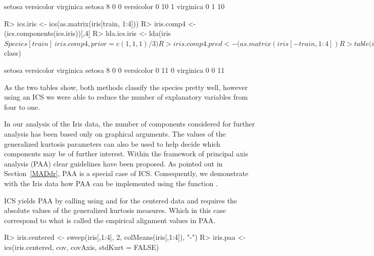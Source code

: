 \documentclass[article,nojss]{jss}
\begin{document}
\begin{Schunk}
\begin{Soutput}
             setosa versicolor virginica
  setosa          8          0         0
  versicolor      0         10         1
  virginica       0          1        10
\end{Soutput}
\begin{Sinput}
R> ics.iris <- ics(as.matrix(iris[train, 1:4]))
R> iris.comp4 <- (ics.components(ics.iris))[,4]
R> lda.ics.iris <- lda(iris$Species[train] ~ iris.comp4, prior = c(1, 1, 1)/3)
R> iris.comp4.pred <- (as.matrix(iris[-train, 1:4]) %
R> table(iris[-train, 5], predict( lda.ics.iris, 
+  data.frame(iris.comp4 = iris.comp4.pred))$class)
\end{Sinput}
\begin{Soutput}
             setosa versicolor virginica
  setosa          8          0         0
  versicolor      0         11         0
  virginica       0          0        11
\end{Soutput}
\end{Schunk}

As the two tables show, both methods classify the species pretty well, however using an ICS
we were able to reduce the number of explanatory variables from four to one.

In our analysis of the Iris data, the number of components considered for further analysis has been based only on graphical
arguments. The values of the generalized kurtosis parameters can also be used to help decide which components may be of
further interest. Within the framework of principal axis analysis ({PAA}) clear guidelines have been proposed.
As pointed out in Section~\ref{MADdr}, {PAA} is a special case of {ICS}. Consequently, we demonstrate with the
Iris data how {PAA} can be implemented using the function .

{ICS} yields {PAA} by calling  using 
and  for the centered data and requires the absolute
values of the generalized kurtosis measures. Which in this case
correspond to what is called the empirical alignment values in
{PAA}.
\begin{Schunk}
\begin{Sinput}
R> iris.centered <- sweep(iris[,1:4], 2, colMeans(iris[,1:4]), "-")
R> iris.paa <- ics(iris.centered, cov, covAxis, stdKurt = FALSE)
\end{Sinput}
\end{Schunk}
\end{document}
